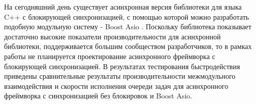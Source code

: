 На сегодняшний день существует асинхронная версия библиотеки для языка C++ с блокирующей синхронизацией, с помощью которой можно разработать подобную модульную систему - Boost Asio \cite{torjo2013boost}. Поскольку библиотека показывает достаточно высокие показатели производительности для асинхронной библиотеки, поддерживается большим сообществом разработчиков, то в рамках работы не планируется проектирование асинхронного фреймворка с блокирующей синхронизацией. В результатах тестирования быстродействия приведены сравнительные результаты производительности межмодульного взаимодействия и скорости исполнения очереди задач для асинхронного фреймворка с синхронизацией без блокировок и Boost Asio.






